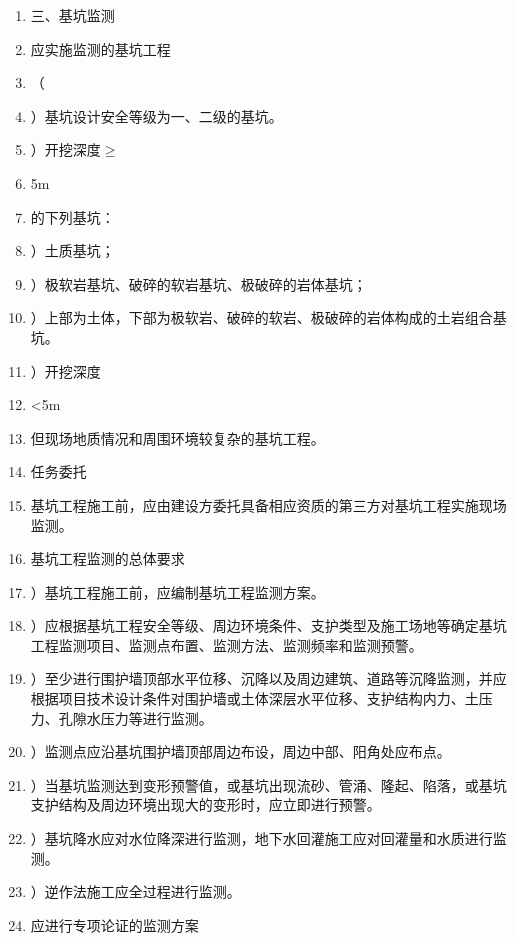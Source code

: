 \documentclass[UTF8,fontset=fandol,11pt]{ctexart}
\begin{document}
\begin{enumerate}[label=\arabic*.]

\item 三、基坑监测

\item 应实施监测的基坑工程

\item （

\item ）基坑设计安全等级为一、二级的基坑。

\item ）开挖深度$\geq$

\item 5m

\item 的下列基坑：

\item ）土质基坑；

\item ）极软岩基坑、破碎的软岩基坑、极破碎的岩体基坑；

\item ）上部为土体，下部为极软岩、破碎的软岩、极破碎的岩体构成的土岩组合基坑。

\item ）开挖深度

\item <5m

\item 但现场地质情况和周围环境较复杂的基坑工程。

\item 任务委托

\item 基坑工程施工前，应由建设方委托具备相应资质的第三方对基坑工程实施现场监测。

\item 基坑工程监测的总体要求

\item ）基坑工程施工前，应编制基坑工程监测方案。

\item ）应根据基坑工程安全等级、周边环境条件、支护类型及施工场地等确定基坑工程监测项目、监测点布置、监测方法、监测频率和监测预警。

\item ）至少进行围护墙顶部水平位移、沉降以及周边建筑、道路等沉降监测，并应根据项目技术设计条件对围护墙或土体深层水平位移、支护结构内力、土压力、孔隙水压力等进行监测。

\item ）监测点应沿基坑围护墙顶部周边布设，周边中部、阳角处应布点。

\item ）当基坑监测达到变形预警值，或基坑出现流砂、管涌、隆起、陷落，或基坑支护结构及周边环境出现大的变形时，应立即进行预警。

\item ）基坑降水应对水位降深进行监测，地下水回灌施工应对回灌量和水质进行监测。

\item ）逆作法施工应全过程进行监测。

\item 应进行专项论证的监测方案

\end{enumerate}
\end{document}
